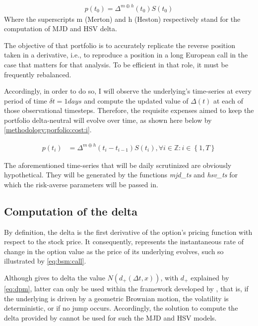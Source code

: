 \documentclass[a4paper, 12pt]{report}
\newcommand{\Dt}{\Delta t}
\newcommand{\N}[1]{N\left(#1\right)}
\newcommand{\dsub}[1]{d_{#1}\left(\Dt, x\right)}
\begin{document}
\begin{align}
p(t_0) = \Delta^{m \oplus h}(t_0) S(t_0) \label{methodology:porfolio:cost:0}
\end{align}
Where the superscripts m (Merton) and h (Heston) respectively stand for the computation of MJD and HSV delta.

The objective of that portfolio is to accurately replicate the reverse position taken in a derivative, i.e., to reproduce a position in a long European call in the case that matters for that analysis.
To be efficient in that role, it must be frequently rebalanced.

Accordingly, in order to do so, I will observe the underlying's time-series at every period of time $\delta t = 1 days$ and compute the updated value of $\Delta(t)$  at each of those observational timesteps.
Therefore, the requisite expenses aimed to keep the portfolio delta-neutral will evolve over time, as shown here below by \cref{methodology:porfolio:cost:i}.

\begin{align}
p(t_i) & = \Delta^{m \oplus h}(t_i - t_{i - 1}) S(t_i) 
,\forall i \in \mathbb{Z} : i \in \left \{1, T \right \}\label{methodology:porfolio:cost:i}
\end{align}

The aforementioned time-series that will be daily scrutinized are obviously hypothetical. They will be generated by the functions \textit{mjd\_ts} and \textit{hsv\_ts} for which the risk-averse parameters will be passed in.





\subsection{Computation of the delta}
\label{sec:methodology:computation:delta}

By definition, the delta is the first derivative of the option's pricing function with respect to the stock price. It consequently, represents the instantaneous rate of change in the option value as the price of its underlying evolves, such so illustrated by \cref{eq:bsm:call}.

Although \citet{bs} gives to delta the value $\N{\dsub{+}}$, with $d_{+}$ explained by \cref{eq:dpm}, latter can only be used within the framework developed by \citet{bs}, that is, if the underlying is driven by a geometric Brownian motion, the volatility is deterministic, or if no jump occurs.
Accordingly, the solution to compute the delta provided by \citet{bs} cannot be used for such the MJD and HSV models.
\end{document}
